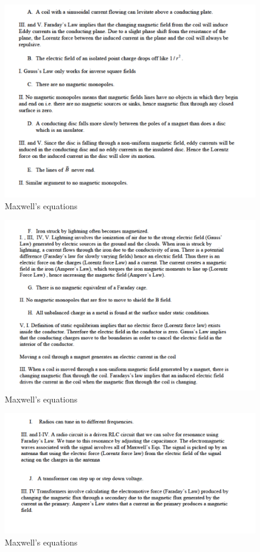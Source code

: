 \documentclass[makesolutionspdf]{esg8022pset}
\begin{document}
\begin{solution}
\begin{figure}[H]
    \centering
    \includegraphics[width = 15cm]{max_gen_sola}
    \caption{Maxwell's equations}
  \end{figure}
  \begin{figure}[H]
    \centering
    \includegraphics[width = 15cm]{max_gen_solb}
    \caption{Maxwell's equations}
  \end{figure}
  \begin{figure}[H]
    \centering
    \includegraphics[width = 15cm]{max_gen_solc}
    \caption{Maxwell's equations}
  \end{figure}

\end{solution}
\end{document}

